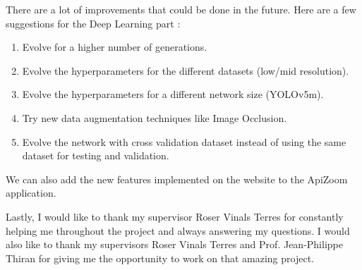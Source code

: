 \documentclass{article}
\begin{document}
\bigskip

There are a lot of improvements that could be done in the future. Here are a few suggestions for the Deep Learning part :
\begin{enumerate}
    \item Evolve for a higher number of generations.
    \item Evolve the hyperparameters for the different datasets (low/mid resolution).
    \item Evolve the hyperparameters for a different network size (YOLOv5m).
    \item Try new data augmentation techniques like Image Occlusion.
    \item Evolve the network with cross validation dataset instead of using the same dataset for testing and validation.
\end{enumerate}

We can also add the new features implemented on the website to the ApiZoom application.


\bigskip

Lastly, I would like to thank my supervisor Roser Vinals Terres for constantly helping me throughout the project and always answering my questions.
I would also like to thank my supervisors Roser Vinals Terres and Prof. Jean-Philippe Thiran for giving me the opportunity to work on that amazing project. 


\newpage


\end{document}
